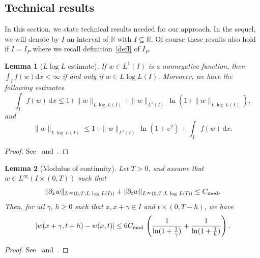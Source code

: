 \documentclass[11pt]{amsart}
\newtheorem{lemma}{Lemma}
\newcommand{\dd}{\mathrm{d}}
\newcommand{\R}{\mathbb{R}}
\begin{document}
\begin{appendix}

\section{Technical results}\label{app.techni}

In this section, we state technical results needed for our approach. In the sequel, we will denote by $I$ an interval of $\R$ with $I \subseteq \R$. Of course these results also hold if $I=I_P$ where we recall definition~\eqref{defI} of $I_P$.

\begin{lemma}[$ L\log L $ estimate]\label{Llog L estimate} 
If $w \in L^1(I)$ is a nonnegative function, then $ \int_{I} f(w) \dd x <  \infty$ if and only if $w \in L\log L(I)$. Moreover, we have the following estimates
\begin{equation}\label{f in llogl}
    \int_{I} f(w) \, \dd x \leq 1 + \|w\|_{L\,\log \,L(I)} + \|w\|_{L^1(I)} \, \ln\left(1 + \|w\|_{L\,\log \,L(I)}\right),
\end{equation}
and
\begin{equation}\label{w in llogl}
    \|w\|_{L\,\log \,L (I)}\leq 1 + \|w\|_{L^1(I)}\,\ln(1 + e^2) +   \int_{I} f(w) \, \dd x.
\end{equation}
\end{lemma}

\begin{proof}
See~\cite[Lemma 3.2]{HaMo10} and~\cite[Lemma 4.1]{2}.
\end{proof}

\begin{lemma}[Modulus of continuity]\label{modulus of continuity} 
Let $T > 0$, and assume that $w \in L^{\infty}(I\times(0,T))$ such that
\[
\|\partial_x w\|_{L^{\infty}(0, T; L\,\log\, L(I))} + \|\partial_t w\|_{L^{\infty}(0, T; L\,\log\, L(I))}  \leq C_{\rm mod}.
\]
Then, for all $\gamma, \,h \geq 0$ such that $x, x+\gamma \in I$ and $t \times (0, T - h)$, we have 
\[
\left|w(x + \gamma, t+h) - w(x, t)\right| \leq 6 C_{\rm mod} \, \left( \frac{1}{\ln(1 + \frac{1}{\gamma})} + \frac{1}{\ln(1 + \frac{1}{h})}\right).
\]
\end{lemma}

\begin{proof}
See~\cite[Lemma 4.3]{HaMo10} and~\cite[Lemma 4.4]{2}.
\end{proof}


\end{appendix}
\end{document}
